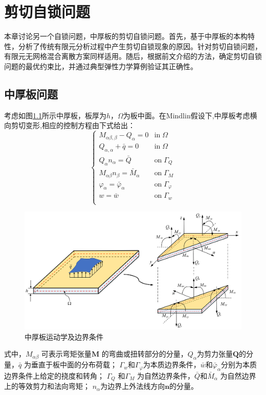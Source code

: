 \chapter{剪切自锁问题}
本章讨论另一个自锁问题，中厚板的剪切自锁问题。首先，基于中厚板的本构特性，分析了传统有限元分析过程中产生剪切自锁现象的原因。针对剪切自锁问题，有限元无网格混合离散方案同样适用。随后，根据前文介绍的方法，确定剪切自锁问题的最优约束比，并通过典型弹性力学算例验证其正确性。
\section{中厚板问题}    
考虑如图\ref{ch_5:fig:mindlin_picture}所示中厚板，板厚为$h$，$\Omega$为板中面。在Mindlin假设下,中厚板考虑横向剪切变形,相应的控制方程由下式给出：
\begin{equation}\label{ch_5:eq:strong_mindlin}
    \begin{cases}
        M_{\alpha\beta,\beta} - Q_\alpha = 0 & \textrm{in}\; \Omega \\
        Q_{\alpha,\alpha} + \bar q = 0 & \textrm{in}\; \Omega \\    Q_\alpha n_\alpha = \bar Q & \textrm{on}\; \Gamma_Q \\
        M_{\alpha\beta} n_\beta = \bar M_\alpha & \textrm{on}\; \Gamma_M \\
        \varphi_\alpha = \bar \varphi_\alpha & \textrm{on}\; \Gamma_\varphi \\
        w = \bar w & \textrm{on}\; \Gamma_w \\
    \end{cases}
\end{equation}
\begin{figure}[!h]
    \centering 
        \includegraphics[scale=0.5]{figures/shearlocking/Mindlinplate.png}
        \caption{中厚板运动学及边界条件}\label{ch_5:fig:mindlin_picture}
\end{figure}
式中，$M_{\alpha \beta}$ 可表示弯矩张量$ \boldsymbol{M}$ 的弯曲或扭转部分的分量，$Q_\alpha$为剪力张量$\boldsymbol{Q}$的分量，$\bar{q}$ 为垂直于板中面的分布荷载；
$\Gamma_w$和$\Gamma_\varphi$为本质边界条件，$\bar{w}$和$\bar{\varphi}_\alpha$分别为本质边界条件上给定的挠度和转角；
$\Gamma_Q$ 和$\Gamma_M$ 为自然边界条件，$\bar Q$和$\bar{M}_{\alpha}$ 为自然边界上的等效剪力和法向弯矩；
$n_\alpha$为边界上外法线方向$\pmb{n}$的分量。


